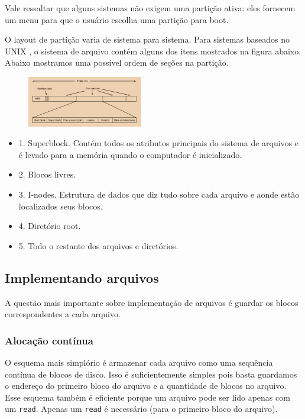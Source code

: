 \documentclass{article}
\newcommand\unix{{\color{red}UNIX} }
\begin{document}
Vale ressaltar que alguns sistemas não exigem uma partição ativa: eles fornecem um menu para que o usuário escolha uma partição para boot. 

O layout de partição varia de sistema para sistema. Para sistemas baseados no \unix, o sistema de arquivo contém alguns dos itens mostrados na figura abaixo. Abaixo mostramos uma possível ordem de seções na partição.

\begin{figure}[h]
  \begin{center}
    \includegraphics[width=0.45\textwidth]{img/5-8.png}
  \end{center}
  \caption{}
  \label{fig:}
\end{figure}


\begin{itemize}
  \item 1. Superblock. Contém todos os atributos principais do sistema de arquivos e é levado para a memória quando o computador é inicializado.
  \item 2. Blocos livres.
  \item 3. I-nodes. Estrutura de dados que diz tudo sobre cada arquivo e aonde estão localizados seus blocos.
  \item 4. Diretório root.
  \item 5. Todo o restante dos arquivos e diretórios.
\end{itemize}

\subsection{Implementando arquivos}

A questão mais importante sobre implementação de arquivos é guardar os blocos correspondentes a cada arquivo.

\subsubsection{Alocação contínua}

O esquema mais simplório é armazenar cada arquivo como uma sequência contínua de blocos de disco. Isso é suficientemente simples pois basta guardamos o endereço do primeiro bloco do arquivo e a quantidade de blocos no arquivo. Esse esquema também é eficiente porque um arquivo pode ser lido apenas com um \verb|read|. Apenas um \verb|read| é necessário (para o primeiro bloco do arquivo).
\end{document}

